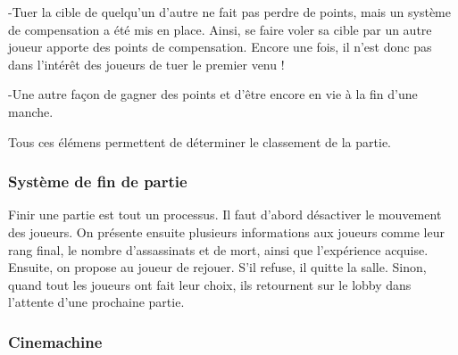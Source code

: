 	-Tuer la cible de quelqu'un d'autre ne fait pas perdre de points, mais un système de compensation a été mis en place. Ainsi, se faire voler sa cible par un autre joueur apporte des points de compensation. Encore une fois, il n'est donc pas dans l'intérêt 
	des joueurs de tuer le premier venu !

	-Une autre façon de gagner des points et d'être encore en vie à la fin d'une manche.

    Tous ces élémens permettent de déterminer le classement de la partie.
	
\subsubsection{Système de fin de partie}
	Finir une partie est tout un processus. Il faut d'abord désactiver le mouvement des joueurs.
	On présente ensuite plusieurs informations aux joueurs comme leur rang final, le nombre d'assassinats
	et de mort, ainsi que l'expérience acquise. Ensuite, on propose au joueur de rejouer. S'il refuse, il quitte la salle.
	Sinon, quand tout les joueurs ont fait leur choix, ils retournent sur le lobby dans l'attente d'une prochaine partie.

\subsubsection{Cinemachine}